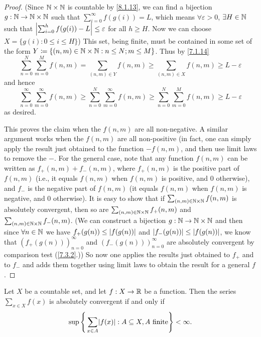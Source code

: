 \begin{proof}
  (Since \(\mathbb{N} \times \mathbb{N}\) is countable by \cref{8.1.13}, we can find a bijection \(g : \mathbb{N} \to \mathbb{N} \times \mathbb{N}\) such that \(\sum_{i = 0}^\infty f(g(i)) = L\), which means \(\forall \varepsilon > 0\), \(\exists H \in \mathbb{N}\) such that \(\left\lvert\sum_{i = 0}^h f(g(i)) - L\right\rvert \leq \varepsilon\) for all \(h \geq H\).
  Now we can choose \(X = \{g(i) : 0 \leq i \leq H\}\))
  This set, being finite, must be contained in some set of the form \(Y \coloneqq \{(n,m) \in \mathbb{N} \times \mathbb{N} : n \leq N; m \leq M \}\).
  Thus by \cref{7.1.14}
  \[
    \sum_{n = 0}^N \sum_{m = 0}^M f(n, m) = \sum_{(n, m) \in Y} f(n, m) \geq \sum_{(n, m) \in X} f(n, m) \geq L - \varepsilon
  \]
  and hence
  \[
    \sum_{n = 0}^\infty \sum_{m = 0}^\infty f(n, m) \geq \sum_{n = 0}^N \sum_{m = 0}^\infty f(n, m) \geq \sum_{n = 0}^N \sum_{m = 0}^M f(n, m) \geq L - \varepsilon
  \]
  as desired.

  This proves the claim when the \(f(n, m)\) are all non-negative.
  A similar argument works when the \(f(n, m)\) are all non-positive
  (in fact, one can simply apply the result just obtained to the function \(-f(n, m)\), and then use limit laws to remove the \(-\).
  For the general case, note that any function \(f(n, m)\) can be written as \(f_+(n, m) + f_-(n, m)\), where \(f_+(n, m)\) is the positive part of \(f(n, m)\)
  (i.e., it equals \(f(n, m)\) when \(f(n, m)\) is positive, and \(0\) otherwise),
  and \(f_-\) is the negative part of \(f(n, m)\)
  (it equals \(f(n, m)\) when \(f(n, m)\) is negative, and \(0\) otherwise).
  It is easy to show that if \(\sum_{(n, m) \in \mathbb{N} \times \mathbb{N}} f(n, m)\) is absolutely convergent, then so are \(\sum_{(n, m) \in \mathbb{N} \times \mathbb{N}} f_+(n, m)\) and \(\sum_{(n, m) \in \mathbb{N} \times \mathbb{N}} f_-(n, m)\).
  (We can construct a bijection \(g : \mathbb{N} \to \mathbb{N} \times \mathbb{N}\) and then since \(\forall n \in \mathbb{N}\) we have \(f_+(g(n)) \leq \left\lvert f(g(n))\right\rvert\) and \(\left\lvert f_-(g(n))\right\rvert \leq \left\lvert f(g(n))\right\rvert\), we know that \((f_+(g(n)))_{n = 0}^\infty\) and \((f_-(g(n)))_{n = 0}^\infty\) are absolutely convergent by comparison test (\cref{7.3.2}.))
  So now one applies the results just obtained to \(f_+\) and to \(f_-\) and adds them together using limit laws to obtain the result for a general \(f\).
\end{proof}

\begin{lem}\label{8.2.3}
  Let \(X\) be a countable set, and let \(f : X \to \mathbb{R}\) be a function.
  Then the series \(\sum_{x \in X} f(x)\) is absolutely convergent if and only if
  \[
    \sup\Bigg\{\sum_{x \in A} \abs{f(x)} : A \subseteq X, A \text{ finite}\Bigg\} < \infty.
  \]
\end{lem}

